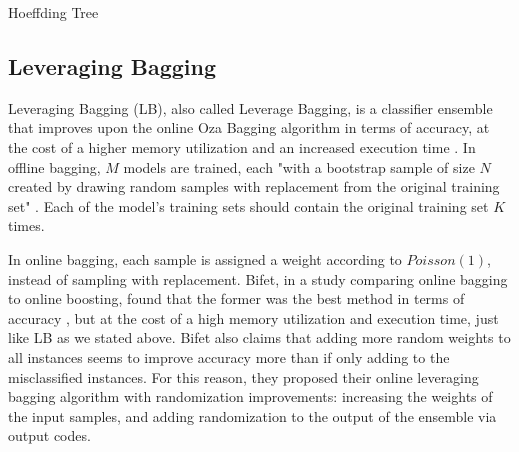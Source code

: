 \begin{algorithm}
\caption{Hoeffding Tree\label{alg:vfdt} \cite{bifet2018machine}}
\setcounter{AlgoLine}{0}
\end{algorithm}

\subsection{Leveraging Bagging\label{section:leveraging-bagging}}
Leveraging Bagging (LB), also called Leverage Bagging, is a classifier ensemble that improves upon the online Oza Bagging algorithm in terms of accuracy, at the cost of a higher memory utilization and an increased execution time \cite{bifet2010leveraging}. In offline bagging, $M$ models are trained, each "with a bootstrap sample of size $N$ created by drawing random samples with replacement from the original training set" \cite{bifet2010leveraging}. Each of the model's training sets should contain the original training set $K$ times.

In online bagging, each sample is assigned a weight according to $Poisson(1)$, instead of sampling with replacement. Bifet, in a study comparing online bagging to online boosting, found that the former was the best method in terms of accuracy \cite{bifet2009new}, but at the cost of a high memory utilization and execution time, just like LB as we stated above. Bifet also claims that adding more random weights to all instances seems to improve accuracy more than if only adding to the misclassified instances. For this reason, they proposed their online leveraging bagging algorithm with randomization improvements: increasing the weights of the input samples, and adding randomization to the output of the ensemble via output codes.

